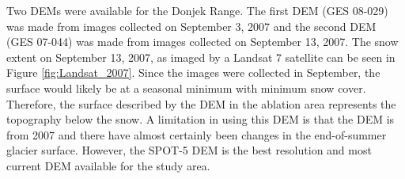 \documentclass{sfuthesis}
\begin{document}
Two DEMs were available for the Donjek Range. The first DEM (GES 08-029) was made from images collected on September 3, 2007 and the second DEM (GES 07-044) was made from images collected on September 13, 2007. The snow extent on September 13, 2007, as imaged by a Landsat 7 satellite can be seen in Figure \ref{fig:Landsat_2007}. Since the images were collected in September, the surface would likely be at a seasonal minimum with minimum snow cover. Therefore, the surface described by the DEM in the ablation area represents the topography below the snow. A limitation in using this DEM is that the DEM is from 2007 and there have almost certainly been changes in the end-of-summer glacier surface. However, the SPOT-5 DEM is the best resolution and most current DEM available for the study area. 

\begin{figure}[H]
    \centering
    \begin{subfigure}[b]{0.48\textwidth}
        \caption{}
        \label{fig:8029_original}
    \end{subfigure}
    ~
    \begin{subfigure}[b]{0.48\textwidth}
        \caption{}
        \label{fig:7044_original}
    \end{subfigure}


\end{figure}
\end{document}
